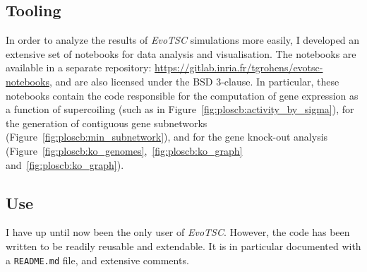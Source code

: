 \subsection{Tooling}

In order to analyze the results of  \emph{EvoTSC} simulations more easily, I developed an extensive set of notebooks for data analysis and visualisation.
The notebooks are available in a separate repository: \url{https://gitlab.inria.fr/tgrohens/evotsc-notebooks}, and are also licensed under the BSD 3-clause.
In particular, these notebooks contain the code responsible for the computation of gene expression as a function of supercoiling (such as in Figure~\ref{fig:ploscb:activity_by_sigma}), for the generation of contiguous gene subnetworks (Figure~\ref{fig:ploscb:min_subnetwork}), and for the gene knock-out analysis (Figure~\ref{fig:ploscb:ko_genomes},~\ref{fig:ploscb:ko_graph} and~\ref{fig:ploscb:ko_graph}).

\subsection{Use}

I have up until now been the only user of \emph{EvoTSC}.
However, the code has been written to be readily reusable and extendable.
It is in particular documented with a \texttt{README.md} file, and extensive comments.


%
